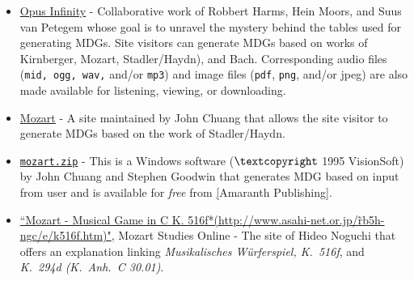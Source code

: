 \documentclass[letterpaper,x11names,svgnames,10pt]{article}
\begin{document}
{\begin{itemize}
	\item \hyperlink{https://opus-infinity.org/}{Opus Infinity} - Collaborative work of Robbert Harms, Hein Moors, and Suus van Petegem whose goal is to unravel the mystery behind the tables used for generating MDGs.  Site visitors can generate MDGs based on works of Kirnberger, Mozart, Stadler/Haydn), and Bach.  Corresponding audio files ({\tt mid, ogg, wav,} and/or {\tt mp3})
	and image files ({\tt pdf}, {\tt png}, and/or {jpeg}) are also made available for listening, viewing, or downloading.
	
	\item  \hyperlink{http://sunsite.univie.ac.at/Mozart/dice/}{Mozart} - A site maintained by John Chuang that allows the site visitor to generate MDGs based on the work of Stadler/Haydn.
 	
 	\item \hyperlink{http://www.amaranthpublishing.com/MozartDiceGame.htm}{\tt mozart.zip} -  This is a Windows software ($\textcopyright$ 1995 VisionSoft) by John Chuang and Stephen Goodwin that generates MDG based on input from user and is available for {\it free} from  \hyperlink{http://www.amaranthpublishing.com/MozartDiceGame.htm}[Amaranth Publishing].  
 	
 	\item \hyperref{(http://www.asahi-net.or.jp/\~rb5h-ngc/e/k516f.htm}{}{}{``Mozart - Musical Game in C K. 516f*(http://www.asahi-net.or.jp/\~rb5h-ngc/e/k516f.htm)"},	Mozart Studies Online - The site of Hideo Noguchi that offers an explanation linking {\em Musikalisches W\"{u}rferspiel, K.\ 516f}, and  {\em K.\ 294d (K.\ Anh.\ C 30.01)}. 
\end{itemize}

}
\end{document}
